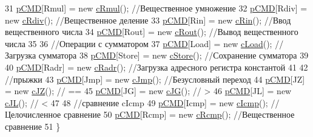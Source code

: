 \begin{DoxyCode}
31     \hyperlink{class_computer_a297a9b79381a9f2005c574f09ea73d70}{pCMD}[Rmul]  =   \textcolor{keyword}{new} \hyperlink{classc_rmul}{cRmul}();    \textcolor{comment}{//Вещественное умножение}
32     \hyperlink{class_computer_a297a9b79381a9f2005c574f09ea73d70}{pCMD}[Rdiv]  =   \textcolor{keyword}{new} \hyperlink{classc_rdiv}{cRdiv}();    \textcolor{comment}{//Вещественное деление}
33     \hyperlink{class_computer_a297a9b79381a9f2005c574f09ea73d70}{pCMD}[Rin]   =   \textcolor{keyword}{new} \hyperlink{classc_rin}{cRin}();     \textcolor{comment}{//Ввод вещественного числа}
34     \hyperlink{class_computer_a297a9b79381a9f2005c574f09ea73d70}{pCMD}[Rout]  =   \textcolor{keyword}{new} \hyperlink{classc_rout}{cRout}();    \textcolor{comment}{//Вывод вещественного числа}
35 
36     \textcolor{comment}{//Операции с сумматором}
37     \hyperlink{class_computer_a297a9b79381a9f2005c574f09ea73d70}{pCMD}[Load]  =   \textcolor{keyword}{new} \hyperlink{classc_load}{cLoad}();    \textcolor{comment}{//Загрузка сумматора}
38     \hyperlink{class_computer_a297a9b79381a9f2005c574f09ea73d70}{pCMD}[Store] =   \textcolor{keyword}{new} \hyperlink{classc_store}{cStore}();   \textcolor{comment}{//Сохранение сумматора}
39 
40     \hyperlink{class_computer_a297a9b79381a9f2005c574f09ea73d70}{pCMD}[Radr]  =   \textcolor{keyword}{new} \hyperlink{classc_radr}{cRadr}();    \textcolor{comment}{//Загрузка адресного регистра константой}
41 
42     \textcolor{comment}{//прыжки}
43     \hyperlink{class_computer_a297a9b79381a9f2005c574f09ea73d70}{pCMD}[Jmp]   =   \textcolor{keyword}{new} \hyperlink{classc_jmp}{cJmp}();     \textcolor{comment}{//Безусловный переход}
44     \hyperlink{class_computer_a297a9b79381a9f2005c574f09ea73d70}{pCMD}[JZ]    =   \textcolor{keyword}{new} \hyperlink{classc_j_z}{cJZ}();      \textcolor{comment}{// ==}
45     \hyperlink{class_computer_a297a9b79381a9f2005c574f09ea73d70}{pCMD}[JG]    =   \textcolor{keyword}{new} \hyperlink{classc_j_g}{cJG}();      \textcolor{comment}{// >}
46     \hyperlink{class_computer_a297a9b79381a9f2005c574f09ea73d70}{pCMD}[JL]    =   \textcolor{keyword}{new} \hyperlink{classc_j_l}{cJL}();      \textcolor{comment}{// <}
47 
48     \textcolor{comment}{//сравнение cIcmp}
49     \hyperlink{class_computer_a297a9b79381a9f2005c574f09ea73d70}{pCMD}[Icmp]  =   \textcolor{keyword}{new} \hyperlink{classc_icmp}{cIcmp}();    \textcolor{comment}{//Целочисленное сравнение}
50     \hyperlink{class_computer_a297a9b79381a9f2005c574f09ea73d70}{pCMD}[Rcmp]  =   \textcolor{keyword}{new} \hyperlink{classc_rcmp}{cRcmp}();    \textcolor{comment}{//Вещественное сравнение}
51 \}
\end{DoxyCode}


